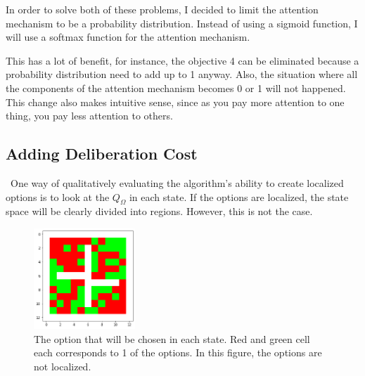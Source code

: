 \documentclass{article}
\begin{document}
	\quad In order to solve both of these problems, I decided to limit the attention mechanism to be a probability distribution. Instead of using a sigmoid function, I will use a softmax function for the attention mechanism.
	
	\quad This has a lot of benefit, for instance, the objective 4 can be eliminated because a probability distribution need to add up to 1 anyway. Also, the situation where all the components of the attention mechanism becomes 0 or 1 will not happened. This change also makes intuitive sense, since as you pay more attention to one thing, you pay less attention to others.
	\subsection*{Adding Deliberation Cost}
	\qquad \ One way of qualitatively evaluating the algorithm's ability to create localized options is to look at the $Q_\Omega$ in each state. If the options are localized, the state space will be clearly divided into regions. However, this is not the case.
	\begin{figure}[h]
		\centering
		\includegraphics[width=1.5in]{noDC.png}
		\caption{The option that will be chosen in each state. Red and green cell each corresponds to 1 of the options. In this figure, the options are not localized.}
	\end{figure}
\end{document}
